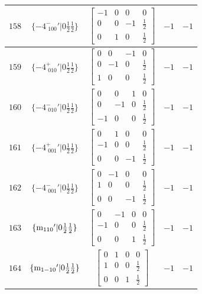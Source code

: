 \documentclass[fleqn,8pt]{jsarticle}
\begin{document}
\begin{longtable}{ccccc}
$ 158 $ & $ \{-4^{-}_{\,\,100}{}'|0 \frac{1}{2} \frac{1}{2}\} $ & $ \begin{bmatrix} -1 & 0 & 0 & 0 \\ 0 & 0 & -1 & \frac{1}{2} \\ 0 & 1 & 0 & \frac{1}{2} \end{bmatrix} $ & $ -1 $ & $ -1 $ \\ \hline
$ 159 $ & $ \{-4^{+}_{\,\,010}{}'|0 \frac{1}{2} \frac{1}{2}\} $ & $ \begin{bmatrix} 0 & 0 & -1 & 0 \\ 0 & -1 & 0 & \frac{1}{2} \\ 1 & 0 & 0 & \frac{1}{2} \end{bmatrix} $ & $ -1 $ & $ -1 $ \\ \hline
$ 160 $ & $ \{-4^{-}_{\,\,010}{}'|0 \frac{1}{2} \frac{1}{2}\} $ & $ \begin{bmatrix} 0 & 0 & 1 & 0 \\ 0 & -1 & 0 & \frac{1}{2} \\ -1 & 0 & 0 & \frac{1}{2} \end{bmatrix} $ & $ -1 $ & $ -1 $ \\ \hline
$ 161 $ & $ \{-4^{+}_{\,\,001}{}'|0 \frac{1}{2} \frac{1}{2}\} $ & $ \begin{bmatrix} 0 & 1 & 0 & 0 \\ -1 & 0 & 0 & \frac{1}{2} \\ 0 & 0 & -1 & \frac{1}{2} \end{bmatrix} $ & $ -1 $ & $ -1 $ \\ \hline
$ 162 $ & $ \{-4^{-}_{\,\,001}{}'|0 \frac{1}{2} \frac{1}{2}\} $ & $ \begin{bmatrix} 0 & -1 & 0 & 0 \\ 1 & 0 & 0 & \frac{1}{2} \\ 0 & 0 & -1 & \frac{1}{2} \end{bmatrix} $ & $ -1 $ & $ -1 $ \\ \hline
$ 163 $ & $ \{{\rm m}_{110}{}'|0 \frac{1}{2} \frac{1}{2}\} $ & $ \begin{bmatrix} 0 & -1 & 0 & 0 \\ -1 & 0 & 0 & \frac{1}{2} \\ 0 & 0 & 1 & \frac{1}{2} \end{bmatrix} $ & $ -1 $ & $ -1 $ \\ \hline
$ 164 $ & $ \{{\rm m}_{1-10}{}'|0 \frac{1}{2} \frac{1}{2}\} $ & $ \begin{bmatrix} 0 & 1 & 0 & 0 \\ 1 & 0 & 0 & \frac{1}{2} \\ 0 & 0 & 1 & \frac{1}{2} \end{bmatrix} $ & $ -1 $ & $ -1 $ \\ \hline

\end{longtable}
\end{document}
